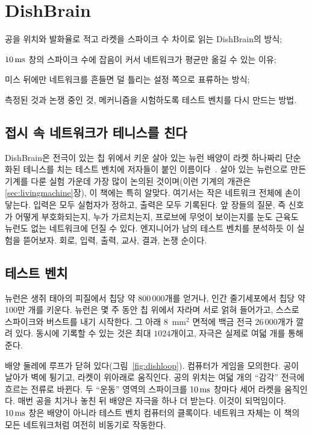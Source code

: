 \chapter{DishBrain}
\label{sec:dishbrain}
\begin{chaptergoals}
\item 공을 위치와 발화율로 적고 라켓을 스파이크 수 차이로 읽는 DishBrain의 방식;
\item $10\,\text{ms}$ 창의 스파이크 수에 잡음이 커서 네트워크가 평균만 옮길 수 있는 이유;
\item 미스 뒤에만 네트워크를 흔들면 덜 틀리는 설정 쪽으로 표류하는 방식;
\item 측정된 것과 논쟁 중인 것, 메커니즘을 시험하도록 테스트 벤치를 다시 만드는 방법.
\end{chaptergoals}

\section{접시 속 네트워크가 테니스를 친다}

DishBrain은 전극이 있는 칩 위에서 키운 살아 있는 뉴런 배양이 라켓 하나짜리 단순화된 테니스를 치는 테스트 벤치에 저자들이 붙인 이름이다~\cite{Kagan2022}. 살아 있는 뉴런으로 만든 기계를 다룬 실험 가운데 가장 많이 논의된 것이며(이런 기계의 개관은 \ref{sec:livingmachine}장), 이 책에는 특히 알맞다. 여기서는 작은 네트워크 전체에 손이 닿는다. 입력은 모두 실험자가 정하고, 출력은 모두 기록된다. 앞 장들의 질문, 즉 신호가 어떻게 부호화되는지, 누가 가르치는지, 프로브에 무엇이 보이는지를 눈도 근육도  뉴런도 없는 네트워크에 던질 수 있다. 엔지니어가 남의 테스트 벤치를 분석하듯 이 실험을 뜯어보자. 회로, 입력, 출력, 교사, 결과, 논쟁 순이다.

\section{테스트 벤치}

뉴런은 생쥐 태아의 피질에서 칩당 약 $800\,000$개를 얻거나, 인간 줄기세포에서 칩당 약 100만 개를 키운다. 뉴런은 몇 주 동안 칩 위에서 자라며 서로 얽혀 들어가고, 스스로 스파이크와 버스트를 내기 시작한다. 그 아래 $8$~mm$^2$ 면적에 백금 전극 $26\,000$개가 깔려 있다. 동시에 기록할 수 있는 것은 최대 $1024$개이고, 자극은 실제로 여덟 개를 통해 준다.

배양 둘레에 루프가 닫혀 있다(그림~\ref{fig:dishloop}). 컴퓨터가 게임을 모의한다. 공이 날아가 벽에 튕기고, 라켓이 위아래로 움직인다. 공의 위치는 여덟 개의 “감각” 전극에 흐르는 전류로 바뀐다. 두 “운동” 영역의 스파이크를 $10\,\text{ms}$ 창마다 세어 라켓을 움직인다. 매번 공을 치거나 놓친 뒤 배양은 자극을 하나 더 받는다. 이것이 되먹임이다. $10\,\text{ms}$ 창은 배양이 아니라 테스트 벤치 컴퓨터의 클록이다. 네트워크 자체는 이 책의 모든 네트워크처럼 여전히 비동기로 작동한다.

